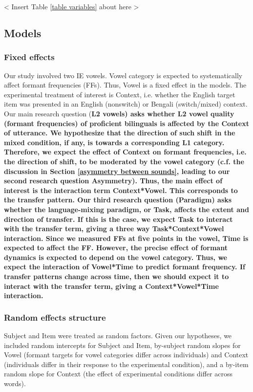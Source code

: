 \documentclass[12 pt]{article}
\begin{document}
< Insert Table \ref{table variables} about here > \\

\subsection{Models}

\subsubsection*{Fixed effects}

Our study involved two IE vowels. Vowel category is expected to systematically affect formant frequencies (FFs). Thus, Vowel is a fixed effect in the models. The experimental treatment of interest is Context, i.e. whether the English target item was presented in an English (nonswitch) or Bengali (switch/mixed) context. Our main research question (\bf{L2 vowels}) asks whether L2 vowel quality (formant frequencies) of proficient bilinguals is affected by the Context of utterance. We hypothesize that the direction of such shift in the mixed condition, if any, is towards a corresponding L1 category. Therefore, we expect the effect of Context on formant frequencies, i.e. the direction of shift, to be moderated by the vowel category (c.f. the discussion in Section \ref{asymmetry between sounds}, leading to our second research question \textbf{Asymmetry}). Thus, the main effect of interest is the interaction term Context*Vowel. This corresponds to the transfer pattern. Our third research question (\bf{Paradigm}) asks whether the language-mixing paradigm, or Task, affects the extent and direction of transfer. If this is the case, we expect Task to interact with the transfer term, giving a three way Task*Context*Vowel interaction. Since we measured FFs at five points in the vowel, Time is expected to affect the FF. However, the precise effect of formant dynamics is expected to depend on the vowel category. Thus, we expect the interaction of Vowel*Time to predict formant frequency. If transfer patterns change across time, then we should expect it to interact with the transfer term, giving a Context*Vowel*Time interaction.

\subsubsection*{Random effects structure}

Subject and Item were treated as random factors. Given our hypotheses, we included random intercepts for Subject and Item, by-subject random slopes for Vowel (formant targets for vowel categories differ across individuals) and Context (individuals differ in their response to the experimental condition), and a by-item random slope for Context (the effect of experimental conditions differ across words). 
\end{document}
